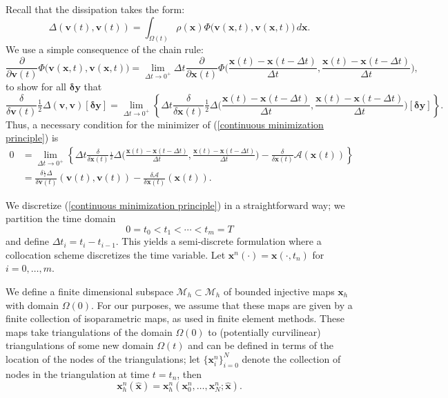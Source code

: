 \documentclass[final,10pt]{article}
\begin{document}
Recall that the dissipation takes the form:
\[
	\Delta(\bm v(t), \bm v(t)) 	= \int_{\Omega(t)} {\rho}(\bm x)\Phi\big(\bm v(\bm x,t),\bm v(\bm x,t) \big) \, d\bm x.
\]
We use a simple consequence of the chain rule:
\[
	\frac{\partial}{\partial {\bm v}(t)} \Phi\big({\bm v}({\bm x},t),{\bm v}({\bm x},t) \big) 
		=	\lim_{\Delta t\rightarrow0^+}\Delta t \frac{\partial}{\partial {\bm x}(t)} 
			\Phi\bigg(\frac{\bm x(t)-\bm x(t-\Delta t)}{\Delta t},\frac{\bm x(t)-\bm x(t-\Delta t)}{\Delta t} \bigg),
\]
to show for all $\bm \delta \bm y$ that
\[
	\frac{\delta}{\delta \bm v(t)}\frac{_1}{^2}\Delta(\bm v, \bm v)[\bm \delta \bm y] 
		= \lim_{\Delta t \rightarrow 0^+} \left\{ \Delta t \frac{\delta}{\delta \bm x(t)}\frac{_1}{^2}
			\Delta\bigg(\frac{\bm x(t)-\bm x(t-\Delta t)}{\Delta t},\frac{\bm x(t)-\bm x(t-\Delta t)}{\Delta t}\bigg)[\bm \delta \bm y] \right\}.
\]
Thus, a necessary condition for the minimizer of (\ref{continuous minimization principle}) is
\begin{align*}
	0	&=\lim_{\Delta t \rightarrow 0^+} \left\{ \Delta t \frac{\delta}{\delta \bm x(t)}\frac{_1}{^2}
				\Delta\bigg(\frac{\bm x(t)-\bm x(t-\Delta t)}{\Delta t},\frac{\bm x(t)-\bm x(t-\Delta t)}{\Delta t}\bigg)
			-	\frac{\delta}{\delta \bm x(t)} \mathcal{A}(\bm x(t))	\right\}	\\
		&=	\frac{\delta\frac{_1}{^2}\Delta}{\delta \bm v(t)}(\bm v(t), \bm v(t)) -	\frac{\delta\mathcal A}{\delta \bm x(t)}(\bm x(t)).
\end{align*}
		

We discretize (\ref{continuous minimization principle}) in a straightforward way;
we partition the time domain
\[
	0 = t_0 < t_1 < \cdots < t_m =T
\]
and define $\Delta t_i = t_i-t_{i-1}$.
This yields a semi-discrete formulation where a collocation scheme discretizes the time variable.
Let $\bm x^n(\cdot) = \bm x( \cdot, t_n)$ for $i=0,\ldots,m$.

We define a finite dimensional subspace $\mathcal{M}_h \subset \mathcal M_h$ of bounded injective maps $\bm x_h$ with domain $\Omega(0)$.
For our purposes, we assume that these maps are given by a finite collection of isoparametric maps, as used in finite element methods.
These maps take triangulations of the domain $\Omega(0)$ to (potentially curvilinear) triangulations of some new domain $\Omega(t)$
and can be defined in terms of the location of the nodes of the triangulations;
let $\{ \bm x^n_i \}_{i=0}^N$ denote the collection of nodes in the triangulation at time $t=t_n$, then
\[
	\bm x^n_h(\hat{\bm x}) = \bm x^n_h( \bm x^n_0,\ldots,\bm x_N^n; \hat{\bm x}).
\]
\end{document}

